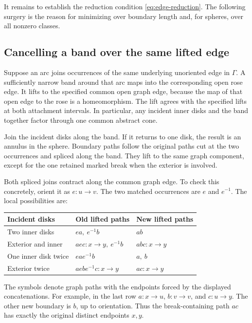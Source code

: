 It remains to establish the reduction condition \eqref{eq:edge-reduction}. The following surgery is the reason for minimizing over boundary length and, for spheres, over all nonzero classes.

\subsection{Cancelling a band over the same lifted edge}

Suppose an arc joins occurrences of the same underlying unoriented edge in \(\Gamma\). A sufficiently narrow band around that arc maps into the corresponding open rose edge. It lifts to the specified common open graph edge, because the map of that open edge to the rose is a homeomorphism. The lift agrees with the specified lifts at both attachment intervals. In particular, any incident inner disks and the band together factor through one common abstract cone.

Join the incident disks along the band. If it returns to one disk, the result is an annulus in the sphere. Boundary paths follow the original paths cut at the two occurrences and spliced along the band. They lift to the same graph component, except for the one retained marked break when the exterior is involved.

Both spliced joins contract along the common graph edge. To check this concretely, orient it as \(e:u\to v\). The two matched occurrences are \(e\) and \(e^{-1}\). The local possibilities are:
\begin{center}
\renewcommand{\arraystretch}{1.18}
\begin{tabular}{@{}p{}p{}p{}@{}}
\toprule
Incident disks & Old lifted paths & New lifted paths\\
\midrule
Two inner disks & \(ea,\ e^{-1}b\) & \(ab\)\\
Exterior and inner & \(aec:x\to y,\ e^{-1}b\) & \(abc:x\to y\)\\
One inner disk twice & \(eae^{-1}b\) & \(a,\ b\)\\
Exterior twice & \(aebe^{-1}c:x\to y\) & \(ac:x\to y\)\\
\bottomrule
\end{tabular}
\end{center}
The symbols denote graph paths with the endpoints forced by the displayed concatenations. For example, in the last row \(a:x\to u\), \(b:v\to v\), and \(c:u\to y\). The other new boundary is \(b\), up to orientation. Thus the break-containing path \(ac\) has exactly the original distinct endpoints \(x,y\).

